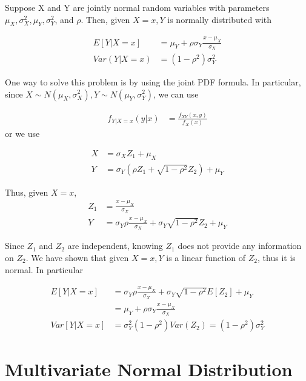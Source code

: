 \begin{theorem}
Suppose X and Y are jointly normal random variables with parameters $\mu_X, \sigma^2_X, \mu_Y, \sigma^2_Y$, and $ \rho $. Then, given $X=x, Y$ is normally distributed with

\begin{align*}
	E[Y|X=x] &= \mu_Y + \rho \sigma_Y \frac{x-\mu_X}{\sigma_X} \\
	Var(Y|X=x) &= (1- \rho^2) \sigma^2_Y
\end{align*}

\end{theorem}

One way to solve this problem is by using the joint PDF formula. In particular, since $X \sim N(\mu_X, \sigma^2_X), Y \sim N(\mu_Y, \sigma^2_Y)$, we can use

\begin{align*}
	f_{Y|X=x} (y|x) &= \frac{f_{XY} (x, y)}{f_X(x)}
\end{align*}
or we use

\begin{align*}
	X &= \sigma_X Z_1 + \mu_X \\
	Y &= \sigma_Y \left(\rho Z_1 + \sqrt{1-\rho^2} Z_2 \right)  + \mu_Y
\end{align*}

Thus, given $X=x$, 
\begin{align*}
	Z_1 &= \frac{x - \mu_X}{\sigma_X} \\
	Y &= \sigma_Y \rho \frac{x- \mu_X}{\sigma_X} + \sigma_Y \sqrt{1- \rho^2} Z_2 + \mu_Y 
\end{align*}

Since $Z_1$ and $Z_2$ are independent, knowing $Z_1$ does not provide any information on $Z_2$. We have shown that given $X=x, Y$ is a linear function of $Z_2$, thus it is normal. In particular

\begin{align*}
	E[Y|X=x] &= \sigma_Y \rho \frac{x- \mu_X}{\sigma_X} + \sigma_Y \sqrt{1- \rho^2} E[Z_2] + \mu_Y  \\
	 &= \mu_Y + \rho \sigma_Y \frac{x-\mu_X}{\sigma_X} \\
	Var[Y|X=x] &= \sigma_Y^2 (1- \rho^2) Var(Z_2) = (1- \rho^2) \sigma_Y^2
\end{align*}



\section{Multivariate Normal Distribution}

